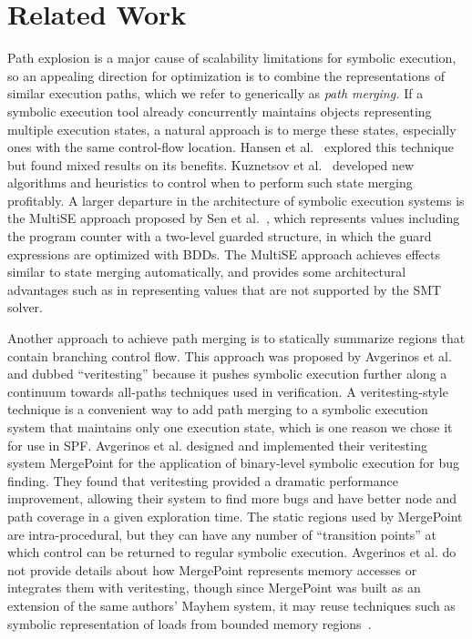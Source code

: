 \section{Related Work}

Path explosion is a major cause of scalability limitations for
symbolic execution, so an appealing direction for optimization is to
combine the representations of similar execution paths, which we refer
to generically as {\em path merging.}
%
If a symbolic execution tool already concurrently maintains objects
representing multiple execution states, a natural approach is to merge
these states, especially ones with the same control-flow location.
%
Hansen et al.~\cite{HansenSS2009} explored this technique but found
mixed results on its benefits.
%
Kuznetsov et al.~\cite{kuznetsov} developed new algorithms and
heuristics to control when to perform such state merging profitably.
%
A larger departure in the architecture of symbolic execution systems
is the MultiSE approach proposed by Sen et al.~\cite{multise}, which
represents values including the program counter with a two-level
guarded structure, in which the guard expressions are optimized with
BDDs.
%
The MultiSE approach achieves effects similar to state merging
automatically, and provides some architectural advantages such as in
representing values that are not supported by the SMT solver.

Another approach to achieve path merging is to statically summarize
regions that contain branching control flow.
%
This approach was proposed by Avgerinos et al.~\cite{veritesting} and
dubbed ``veritesting'' because it pushes symbolic execution further
along a continuum towards all-paths techniques used in verification.
%
A veritesting-style technique is a convenient way to add path merging
to a symbolic execution system that maintains only one execution
state, which is one reason we chose it for use in SPF.
%
Avgerinos et al. designed and implemented their veritesting system
MergePoint for the application of binary-level symbolic execution for
bug finding.
%
They found that veritesting provided a dramatic performance
improvement, allowing their system to find more bugs and have better
node and path coverage in a given exploration time.
%
The static regions used by MergePoint are intra-procedural, but they
can have any number of ``transition points'' at which control can be
returned to regular symbolic execution.
%
Avgerinos et al. do not provide details about how MergePoint
represents memory accesses or integrates them with veritesting, though
since MergePoint was built as an extension of the same authors' Mayhem
system, it may reuse techniques such as symbolic representation of
loads from bounded memory regions~\cite{mayhem}.

